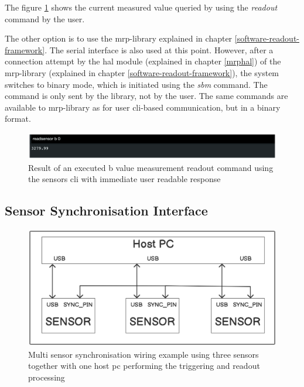 The figure
\ref{Result_of_an_executed_b_value_measurement_readout_command_using_the_sensors_(+cli)_with_immediate_user_readable_response.png}
shows the current measured value queried by using the \emph{readout}
command by the user.

The other option is to use the \gls{mrp}-library explained in chapter
\ref{software-readout-framework}. The serial interface is also used at
this point. However, after a connection attempt by the \gls{hal} module
(explained in chapter \ref{mrphal}) of the \gls{mrp}-library (explained
in chapter \ref{software-readout-framework}), the system switches to
binary mode, which is initiated using the \emph{sbm} command. The
command is only sent by the library, not by the user. The same commands
are available to \gls{mrp}-library as for user \gls{cli}-based
communication, but in a binary format.

\begin{figure}
\centering
\includegraphics{./generated_images/border_Result_of_an_executed_b_value_measurement_readout_command_using_the_sensors_(+cli)_with_immediate_user_readable_response.png}
\caption{Result of an executed b value measurement readout command using
the sensors \gls{cli} with immediate user readable response
\label{Result_of_an_executed_b_value_measurement_readout_command_using_the_sensors_(+cli)_with_immediate_user_readable_response.png}}
\end{figure}

\hypertarget{sensor-synchronisation-interface}{%
\subsection{Sensor Synchronisation
Interface}\label{sensor-synchronisation-interface}}

\begin{figure}
\centering
\includegraphics{./generated_images/border_Multi_sensor_synchronisation_wiring_example_using_three_sensors_together_with_one_host_(+pc)_performing_the_triggering_and_readout_processing.png}
\caption{Multi sensor synchronisation wiring example using three sensors
together with one host \gls{pc} performing the triggering and readout
processing
\label{Multi_sensor_synchronisation_wiring_example_using_three_sensors_together_with_one_host_(+pc)_performing_the_triggering_and_readout_processing.png}}
\end{figure}

